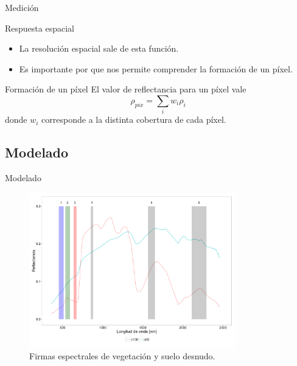\documentclass[handout]{beamer}
\begin{document}
\begin{frame}{Medici\'on}
  \begin{block}{Respuesta espacial}
    \begin{itemize}
      \item La resoluci\'on espacial sale de esta funci\'on.
      \item Es importante por que nos permite comprender la formaci\'on de un p\'ixel.
    \end{itemize}
  \end{block}
  \begin{block}{Formaci\'on de un p\'ixel}
    El valor de reflectancia para un p\'ixel vale
    $$\rho_{pix} = \sum_i w_i \rho_i$$
    donde $w_i$ corresponde a la distinta cobertura de cada p\'ixel.
  \end{block}
\end{frame}

\subsection{Modelado}

\begin{frame}{Modelado}
  \begin{figure}
  \centering
  \includegraphics[width=0.8\textwidth]{imagenes/puras.png}
  \caption{Firmas espectrales de vegetaci\'on y suelo desnudo.}
  \end{figure}
\end{frame}
\end{document}
